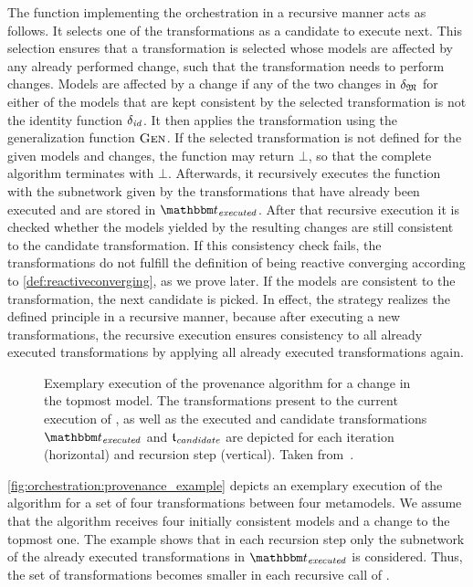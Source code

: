 The function  implementing the orchestration in a recursive manner acts as follows.
It selects one of the transformations as a candidate to execute next.
This selection ensures that a transformation is selected whose models are affected by any already performed change, such that the transformation needs to perform changes.
Models are affected by a change if any of the two changes in $\change{\metamodeltuple{M}}$ for either of the models that are kept consistent by the selected transformation is not the identity function $\delta_{\mathit{id}}$.
It then applies the transformation using the generalization function $\textsc{Gen}_{}$.
If the selected transformation is not defined for the given models and changes, the function may return $\bot$, so that the complete algorithm terminates with $\bot$.
Afterwards, it recursively executes the function  with the subnetwork given by the transformations that have already been executed and are stored in $\provalgexecuted$.
After that recursive execution it is checked whether the models yielded by the resulting changes are still consistent to the candidate transformation.
If this consistency check fails, the transformations do not fulfill the definition of being reactive converging according to \autoref{def:reactiveconverging}, as we prove later.
If the models are consistent to the transformation, the next candidate is picked.
In effect, the strategy realizes the defined principle in a recursive manner, because after executing a new transformations, the recursive execution ensures consistency to all already executed transformations by applying all already executed transformations again.

\begin{figure}
    \centering
    
    \caption[Exemplary execution of the provenance algorithm]{%
    Exemplary execution of the provenance algorithm for a change in the topmost model. 
    The transformations present to the current execution of , as well as the executed and candidate transformations $\provalgexecuted$ and $\provalgcandidate$ are depicted for each iteration (horizontal) and recursion step (vertical). Taken from~\cite[Fig.~4]{gleitze2020orchestration}.
}
    \label{fig:orchestration:provenance_example}
\end{figure}

\autoref{fig:orchestration:provenance_example} depicts an exemplary execution of the  algorithm for a set of four transformations between four metamodels.
We assume that the algorithm receives four initially consistent models and a change to the topmost one.
The example shows that in each recursion step only the subnetwork of the already executed transformations in $\provalgexecuted$ is considered.
Thus, the set of transformations becomes smaller in each recursive call of .


